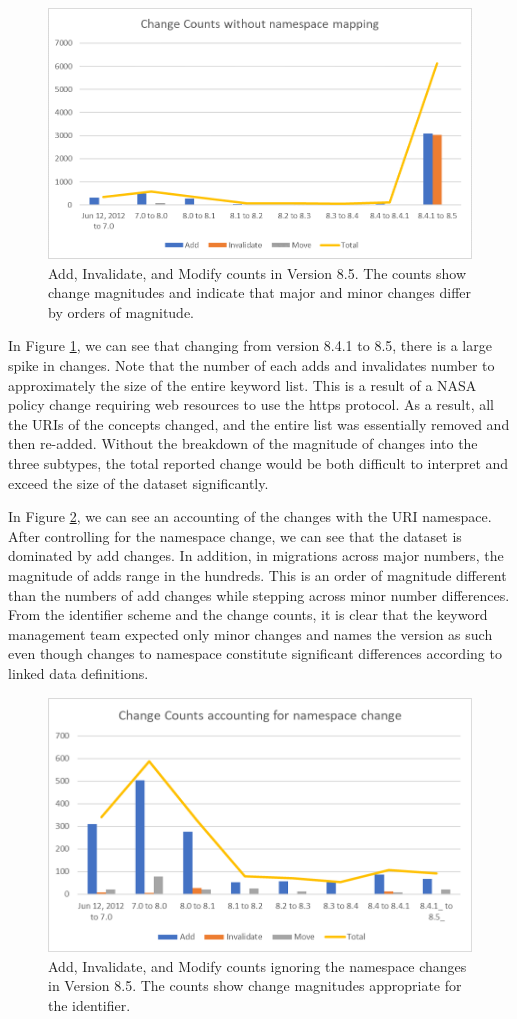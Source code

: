 \begin{figure}%
	\centering
	\includegraphics[scale=1]{figures/GCMDChart1.png}
	\caption{Add, Invalidate, and Modify counts in Version 8.5.  The counts show change magnitudes and indicate that major and minor changes differ by orders of magnitude.}
	\label{GCMDC1}
\end{figure}

In Figure \ref{GCMDC1}, we can see that changing from version 8.4.1 to 8.5, there is a large spike in changes.  Note that the number of each adds and invalidates number to approximately the size of the entire keyword list.  This is a result of a NASA policy change requiring web resources to use the https protocol.  As a result, all the URIs of the concepts changed, and the entire list was essentially removed and then re-added.  Without the breakdown of the magnitude of changes into the three subtypes, the total reported change would be both difficult to interpret and exceed the size of the dataset significantly.

In Figure \ref{GCMDC2}, we can see an accounting of the changes with the URI namespace.  After controlling for the namespace change, we can see that the dataset is dominated by add changes.  In addition, in migrations across major numbers, the magnitude of adds range in the hundreds.  This is an order of magnitude different than the numbers of add changes while stepping across minor number differences.  From the identifier scheme and the change counts, it is clear that the keyword management team expected only minor changes and names the version as such even though changes to namespace constitute significant differences according to linked data definitions.

\begin{figure}%
	\centering
	\includegraphics[scale=1]{figures/GCMDChart2.png}
	\caption{Add, Invalidate, and Modify counts ignoring the namespace changes in Version 8.5.  The counts show change magnitudes appropriate for the identifier.}
	\label{GCMDC2}
\end{figure}